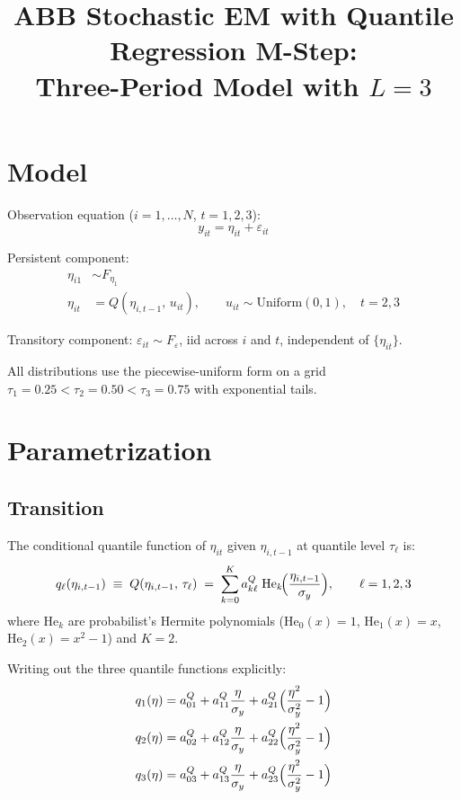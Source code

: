 \documentclass[12pt]{article}
\title{ABB Stochastic EM with Quantile Regression M-Step:\\
Three-Period Model with $L=3$}
\author{}
\date{}
\newcommand{\He}{\mathrm{He}}
\begin{document}
\maketitle

\section{Model}

\noindent Observation equation ($i=1,\dots,N$, $t=1,2,3$):
\begin{equation}
y_{it} = \eta_{it} + \varepsilon_{it}
\end{equation}

\noindent Persistent component:
\begin{align}
\eta_{i1} &\sim F_{\eta_1} \\
\eta_{it} &= Q(\eta_{i,t-1},\, u_{it}), \qquad u_{it} \sim \mathrm{Uniform}(0,1), \quad t=2,3
\end{align}

\noindent Transitory component: $\varepsilon_{it} \sim F_\varepsilon$, iid across $i$ and $t$, independent of $\{\eta_{it}\}$.

\medskip\noindent
All distributions use the piecewise-uniform form on a grid $\tau_1 = 0.25 < \tau_2 = 0.50 < \tau_3 = 0.75$ with exponential tails.

\section{Parametrization}

\subsection{Transition}

The conditional quantile function of $\eta_{it}$ given $\eta_{i,t-1}$ at quantile level $\tau_\ell$ is:
\begin{equation}\label{eq:Q}
q_\ell(\eta_{i,t-1}) \;\equiv\; Q(\eta_{i,t-1},\,\tau_\ell) \;=\; \sum_{k=0}^{K} a_{k\ell}^Q \;\He_k\!\Bigl(\frac{\eta_{i,t-1}}{\sigma_y}\Bigr), \qquad \ell = 1,2,3
\end{equation}
where $\He_k$ are probabilist's Hermite polynomials ($\He_0(x)=1$, $\He_1(x)=x$, $\He_2(x)=x^2-1$) and $K=2$.

Writing out the three quantile functions explicitly:
\begin{align}
q_1(\eta) &= a_{01}^Q + a_{11}^Q \frac{\eta}{\sigma_y} + a_{21}^Q \Bigl(\frac{\eta^2}{\sigma_y^2}-1\Bigr) \\
q_2(\eta) &= a_{02}^Q + a_{12}^Q \frac{\eta}{\sigma_y} + a_{22}^Q \Bigl(\frac{\eta^2}{\sigma_y^2}-1\Bigr) \\
q_3(\eta) &= a_{03}^Q + a_{13}^Q \frac{\eta}{\sigma_y} + a_{23}^Q \Bigl(\frac{\eta^2}{\sigma_y^2}-1\Bigr)
\end{align}
\end{document}
